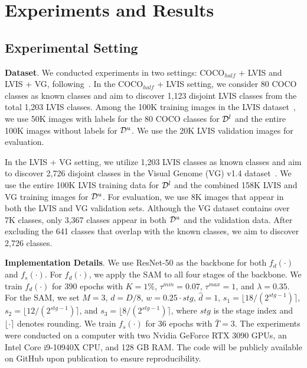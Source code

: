 

\section{Experiments and Results}
\label{sec:result}
\subsection{Experimental Setting}
\noindent \textbf{Dataset}.
We conducted experiments in two settings: COCO$_{half}$ + LVIS and LVIS + VG, following~\cite{fomenko2022learning}. In the COCO$_{half}$ + LVIS setting, we consider 80 COCO classes as known classes and aim to discover 1,123 disjoint LVIS classes from the total 1,203 LVIS classes. Among the 100K training images in the LVIS dataset~\cite{gupta2019lvis}, we use 50K images with labels for the 80 COCO classes for $\mathcal{D}^l$ and the entire 100K images without labels for $\mathcal{D}^u$. We use the 20K LVIS validation images for evaluation.

In the LVIS + VG setting, we utilize 1,203 LVIS classes as known classes and aim to discover 2,726 disjoint classes in the Visual Genome (VG) v1.4 dataset~\cite{krishna2017visual}. We use the entire 100K LVIS training data for $\mathcal{D}^l$ and the combined 158K LVIS and VG training images for $\mathcal{D}^u$. For evaluation, we use 8K images that appear in both the LVIS and VG validation sets. Although the VG dataset contains over 7K classes, only 3,367 classes appear in both $\mathcal{D}^u$ and the validation data. After excluding the 641 classes that overlap with the known classes, we aim to discover 2,726 classes.



\vspace{1mm}
\noindent \textbf{Implementation Details}. 
We use ResNet-50 as the backbone for both $f_d(\cdot)$ and $f_s(\cdot)$. For $f_d(\cdot)$, we apply the SAM to all four stages of the backbone. We train $f_d(\cdot)$ for 390 epochs with $K=1\%$, $\tau^{min}=0.07$, $\tau^{max}=1$, and $\lambda=0.35$. For the SAM, we set $M=3$, $d=D/8$, $w=0.25 \cdot stg$, $\hat{d}=1$, $s_1=\lfloor 18/(2^{stg-1}) \rceil$, $s_2=\lfloor 12/(2^{stg-1}) \rceil$, and $s_3=\lfloor 8/(2^{stg-1}) \rceil$, where $stg$ is the stage index and $\lfloor \cdot \rceil$ denotes rounding. We train $f_s(\cdot)$ for 36 epochs with $\bar{T}=3$. The experiments were conducted on a computer with two Nvidia GeForce RTX 3090 GPUs, an Intel Core i9-10940X CPU, and 128 GB RAM. The code will be publicly available on GitHub upon publication to ensure reproducibility.

